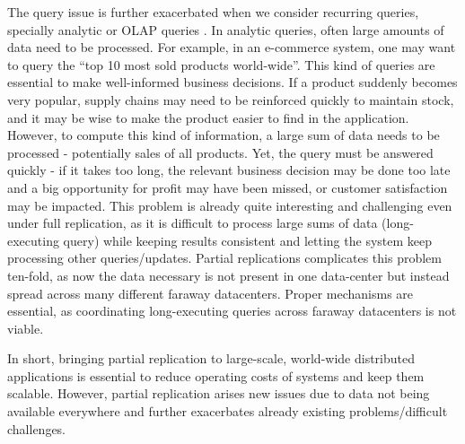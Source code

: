 The query issue is further exacerbated when we consider recurring queries, specially analytic or OLAP queries \cite{???}.
In analytic queries, often large amounts of data need to be processed.
For example, in an e-commerce system, one may want to query the ``top 10 most sold products world-wide''.
This kind of queries are essential to make well-informed business decisions.
If a product suddenly becomes very popular, supply chains may need to be reinforced quickly to maintain stock, and it may be wise to make the product easier to find in the application.
However, to compute this kind of information, a large sum of data needs to be processed - potentially sales of all products.
Yet, the query must be answered quickly - if it takes too long, the relevant business decision may be done too late and a big opportunity for profit may have been missed, or customer satisfaction may be impacted.
This problem is already quite interesting and challenging even under full replication, as it is difficult to process large sums of data (long-executing query) while keeping results consistent and letting the system keep processing other queries/updates.
Partial replications complicates this problem ten-fold, as now the data necessary is not present in one data-center but instead spread across many different faraway datacenters.
Proper mechanisms are essential, as coordinating long-executing queries across faraway datacenters is not viable.

In short, bringing partial replication to large-scale, world-wide distributed applications is essential to reduce operating costs of systems and keep them scalable.
However, partial replication arises new issues due to data not being available everywhere and further exacerbates already existing problems/difficult challenges.






